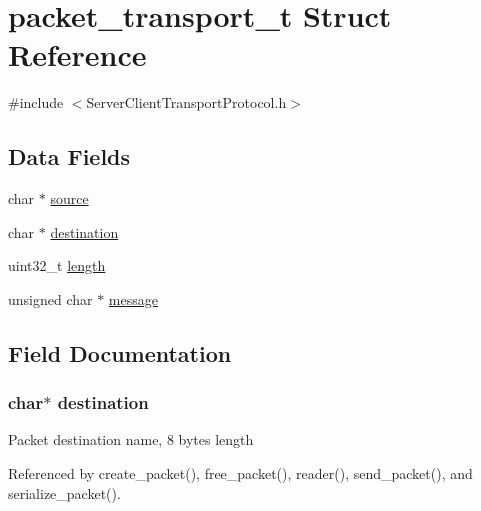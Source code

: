 \hypertarget{structpacket__transport__t}{}\section{packet\+\_\+transport\+\_\+t Struct Reference}
\label{structpacket__transport__t}


{\ttfamily \#include $<$Server\+Client\+Transport\+Protocol.\+h$>$}

\subsection*{Data Fields}
\begin{DoxyCompactItemize}
\item 
char $\ast$ \hyperlink{structpacket__transport__t_aee6937c81d468a0915308234d09d212c}{source}
\item 
char $\ast$ \hyperlink{structpacket__transport__t_ae98a0878a8abb793b89317d904f8c00a}{destination}
\item 
uint32\+\_\+t \hyperlink{structpacket__transport__t_aebb70c2aab3407a9f05334c47131a43b}{length}
\item 
unsigned char $\ast$ \hyperlink{structpacket__transport__t_abb13456032cf48eaa794391b6ed937c7}{message}
\end{DoxyCompactItemize}


\subsection{Field Documentation}
\subsubsection[{\texorpdfstring{destination}{destination}}]{\setlength{\rightskip}{0pt plus 5cm}char$\ast$ destination}\hypertarget{structpacket__transport__t_ae98a0878a8abb793b89317d904f8c00a}{}\label{structpacket__transport__t_ae98a0878a8abb793b89317d904f8c00a}
Packet destination name, 8 bytes length 

Referenced by create\+\_\+packet(), free\+\_\+packet(), reader(), send\+\_\+packet(), and serialize\+\_\+packet().

